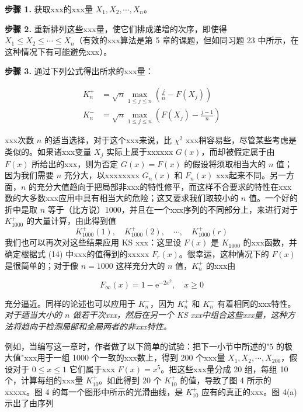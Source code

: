 \textbf{步骤 1.} 获取xxx的xxx量 $X_1, X_2, \cdots, X_n$。

\textbf{步骤 2.} 重新排列这些xxx量，使它们排成递增的次序，即使得 $X_1 \leqslant X_2 \leqslant \cdots \leqslant X_n$（有效的xxx算法是第 5 章的课题，但如同习题 23 中所示，在这种情况下有可能避免xxx）。

\textbf{步骤 3.} 通过下列公式得出所求的xxx量：

\begin{equation}
\begin{aligned}
K_n^+ &= \sqrt{n} \max_{1 \leqslant j \leqslant n} \left( \frac{j}{n} - F(X_j) \right) \\
K_n^- &= \sqrt{n} \max_{1 \leqslant j \leqslant n} \left( F(X_j) - \frac{j-1}{n} \right)
\end{aligned} \tag{13}
\end{equation}

xxx次数 $n$ 的适当选择，对于这个xxx来说，比 $\chi^2$ xxx稍容易些，尽管某些考虑是类似的。如果诸xxx变量 $X_j$ 实际上属于xxxxxx $G(x)$，而却被假定属于由 $F(x)$ 所给出的xxx，则为否定 $G(x) = F(x)$ 的假设将须取相当大的 $n$ 值；因为我们需要 $n$ 充分大，以xxxxxxxx $G_n(x)$ 和 $F_n(x)$ xxx起来不同。另一方面，$n$ 的充分大值趋向于把局部非xxx的特性修平，而这样不合要求的特性在xxx数的大多数xxx应用中具有相当大的危险；这又要求我们取较小的 $n$ 值。一个好的折中是取 $n$ 等于（比方说）1000，并且在一个xxx序列的不同部分上，来进行对于 $K_{1000}^+$ 的大量计算，由此得到值
\begin{equation}
K_{1000}^+(1), \quad K_{1000}^+(2), \quad \cdots, \quad K_{1000}^+(r) \tag{14}
\end{equation}
我们也可以再次对这些结果应用 KS xxx：这里设 $F(x)$ 是 $K_{1000}$ 的xxx函数，并确定根据式 (14) 中xxx的值得到的xxxxx $F_r(x)$。很幸运，这种情况下的 $F(x)$ 是很简单的；对于像 $n = 1000$ 这样充分大的 $n$ 值，$K_n^+$ 的xxx由

\begin{equation}
F_\infty(x) = 1 - \mathrm{e}^{-2x^2}, \quad x \geqslant 0 \tag{15}
\end{equation}

\noindent 充分逼近。同样的论述也可以应用于 $K_n^-$，因为 $K_n^+$ 和 $K_n^-$ 有着相同的xxx特性。\textit{对于适当大小的 $n$ 做若干次xxx，然后在另一个 KS xxx中组合这些xxx量，这种方法将趋向于检测局部和全局两者的非xxx特性。}

例如，当编写这一章时，作者做了以下简单的试验：把下一小节中所述的"5 的极大值"xxx用于一组 1000 个一致的xxx数上，得到 200 个xxx量 $X_1, X_2, \cdots, X_{200}$，假设对于 $0 \leqslant x \leqslant 1$ 它们属于xxx $F(x) = x^5$。把这些xxx量分成 20 组，每组 10 个，计算每组的xxx量 $K_{10}^+$。如此得到 20 个 $K_{10}^+$ 的值，导致了图 4 所示的xxxxx。图 4 的每一个图形中所示的光滑曲线，是 $K_{10}^+$ 应有的真正的xxx。图 4(a) 示出了由序列

